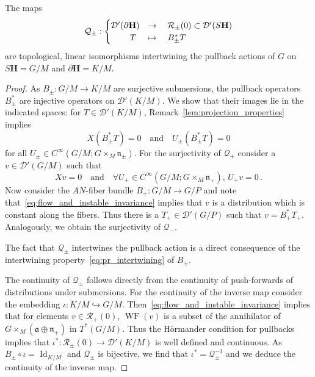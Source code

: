 \documentclass[AHL, Unicode, longabstracts, published]{cedram}
\DeclareMathOperator{\WF}{WF}
\DeclareMathOperator{\Id}{Id}
\newcommand{\mc}{\mathcal}
\newcommand{\bfh}{\mathbf{H}}
\newcommand{\pl}{\partial}
\newcommand{\x}{\times}
\newcommand{\n}{\mathfrak n}
\renewcommand{\a}{\mathfrak a}
\let\oldforall\forall
\renewcommand*{\forall}{\mathrel{\oldforall}}
\begin{document}
\begin{lemm}\label{lem:Q_pm}
The maps
\[
\mathcal Q_\pm: 
\begin{cases}
\mathcal D'(\pl{\bfh}) & \rightarrow\quad\mc{R}_\pm(0)\subset \mc{D}'(S{\bfh})\\
\mkern 40mu T &\mapsto\quad B_{\pm}^*T
\end{cases}
\]
are topological, linear isomorphisms intertwining the pullback actions of $G$ on\linebreak$S{\bfh}=G/M$ and $\pl{\bfh}=K/M$.
\end{lemm}



\begin{proof}
As $B_{\pm}:G/M\to K/M$ are surjective submersions, the pullback operators $B_{\pm}^*$ are injective operators on $\mathcal D'(K/M)$. We show that their images lie in the indicated spaces: for $T\in \mathcal D'(K/M)$, Remark~\ref{lem:projection_properties} implies
\[
X \left(B^*_{\pm}T\right)=0 \quad \text{and}\quad U_\pm \left(B^*_\pm T\right)=0
\]
for all $U_\pm\in C^\infty(G/M;G\times_M \n_\pm)$. For the surjectivity of $\mathcal Q_+$ consider a $v\in \mathcal D'(G/M)$ such that
\begin{equation}\label{eq:flow_and_instable_invariance}
X v= 0\quad\text{and}\quad\forall U_+ \in C^\infty(G/M; G\times_M \n_+),\,U_+ v= 0\,.
\end{equation}
Now consider the $AN$-fiber bundle $B_+: G/M \to G/P$ and note that~\eqref{eq:flow_and_instable_invariance} implies that $v$ is a distribution which is constant along the fibers. Thus there is a $T_+\in\mathcal D'(G/P)$ such that $v= B_+^*T_+ $. Analogously, we obtain the surjectivity of $\mathcal Q_-$.

The fact that $\mathcal Q_\pm$ intertwines the pullback action is a direct consequence of the intertwining property~\eqref{eq:pr_intertwining} of $B_\pm$.

The continuity of $\mathcal Q_\pm$ follows directly from the continuity of push-forwards of distributions under submersions. For the continuity of the inverse map consider the embedding $\iota: K/M \hookrightarrow G/M$. Then~\eqref{eq:flow_and_instable_invariance} implies that for elements $v\in \mc{R}_+(0)$, $\WF(v)$ is a subset of the annihilator of $G\x_M(\a \oplus\n_+)$ in $T^*(G/M)$. Thus the H\"ormander condition for pullbacks~\cite[Theorem~8.2.4]{HoeI} implies that $\iota^*:\mc{R}_\pm(0) \to \mathcal D'(K/M)$ is well defined and continuous. As $B_\pm\circ \iota = \Id_{K/M}$ and $\mathcal Q_\pm$ is bijective, we find that $\iota^*=\mathcal Q_\pm^{-1}$ and we deduce the continuity of the inverse map.
\end{proof}
\end{document}
